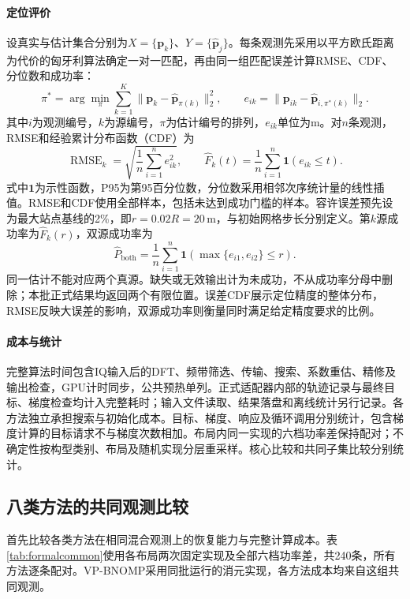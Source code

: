 \documentclass[a4paper,fleqn]{cas-sc}
\numberwithin{equation}{section}
\numberwithin{figure}{section}
\numberwithin{table}{section}
\begin{document}
\par

\FloatBarrier
\paragraph{定位评价}
设真实与估计集合分别为$X=\{\bm p_k\}$、$Y=\{\widehat{\bm p}_j\}$。每条观测先采用以平方欧氏距离为代价的匈牙利算法确定一对一匹配\cite{Kuhn1955}，再由同一组匹配误差计算RMSE、CDF、分位数和成功率：
\begin{equation}
 \pi^*=\arg\min_{\pi}\sum_{k=1}^{K}\|\bm p_k-\widehat{\bm p}_{\pi(k)}\|_2^2,
 \qquad e_{ik}=\|\bm p_{ik}-\widehat{\bm p}_{i,\pi^*(k)}\|_2 .\label{eq:assignment}
\end{equation}
其中$i$为观测编号，$k$为源编号，$\pi$为估计编号的排列，$e_{ik}$单位为m。对$n$条观测，RMSE和经验累计分布函数（CDF）为
\begin{equation}
 \operatorname{RMSE}_k=\sqrt{\frac1n\sum_{i=1}^{n}e_{ik}^2},\qquad
 \widehat F_k(t)=\frac1n\sum_{i=1}^{n}\mathbf 1(e_{ik}\le t).\label{eq:rmseCDF}
\end{equation}
式中$\mathbf 1$为示性函数，P95为第95百分位数，分位数采用相邻次序统计量的线性插值。RMSE和CDF使用全部样本，包括未达到成功门槛的样本。容许误差预先设为最大站点基线的2\%，即$r=0.02R=20$\,m，与初始网格步长分别定义。第$k$源成功率为$\widehat F_k(r)$，双源成功率为
\begin{equation}
 \widehat P_{\mathrm{both}}=\frac1n\sum_{i=1}^{n}
 \mathbf 1\!\left(\max\{e_{i1},e_{i2}\}\le r\right).
\end{equation}
同一估计不能对应两个真源。缺失或无效输出计为未成功，不从成功率分母中删除；本批正式结果均返回两个有限位置。误差CDF展示定位精度的整体分布，RMSE反映大误差的影响，双源成功率则衡量同时满足给定精度要求的比例。

\paragraph{成本与统计}
完整算法时间包含IQ输入后的DFT、频带筛选、传输、搜索、系数重估、精修及输出检查，GPU计时同步，公共预热单列。正式适配器内部的轨迹记录与最终目标、梯度检查均计入完整耗时；输入文件读取、结果落盘和离线统计另行记录。各方法独立承担搜索与初始化成本。目标、梯度、响应及循环调用分别统计，包含梯度计算的目标请求不与梯度次数相加。布局内同一实现的六档功率差保持配对；不确定性按构型类别、布局及随机实现分层重采样。核心比较和共同子集比较分别统计。

\subsection{八类方法的共同观测比较}\label{sec:commonformal}
首先比较各类方法在相同混合观测上的恢复能力与完整计算成本。表\ref{tab:formalcommon}使用各布局两次固定实现及全部六档功率差，共240条，所有方法逐条配对。VP-BNOMP采用同批运行的消元实现，各方法成本均来自这组共同观测。
\end{document}
